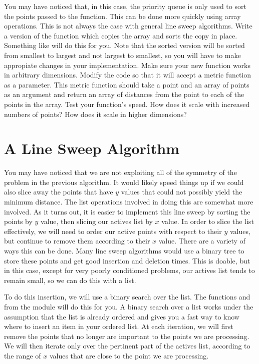 \begin{problem}
You may have noticed that, in this case, the priority queue is only used to sort the points passed to the function. 
This can be done more quickly using array operations. 
This is not always the case with general line sweep algorithms. 
Write a version of the function which copies the array and sorts the copy in place. 
Something like  will do this for you. 
Note that the sorted version will be sorted from smallest to largest and not largest to smallest, so you will have to make appropiate changes in your implementation.
Make sure your new function works in arbitrary dimensions. 
Modify the code so that it will accept a metric function as a parameter. 
This metric function should take a point and an array of points as an argument and return an array of distances from the point to each of the points in the array. 
Test your function's speed. 
How does it scale with increased numbers of points? 
How does it scale in higher dimensions?
\end{problem}

\section*{A Line Sweep Algorithm}

You may have noticed that we are not exploiting all of the symmetry of the problem in the previous algorithm. 
It would likely speed things up if we could also slice away the points that have $y$ values that could not possibly yield the minimum distance. 
The list operations involved in doing this are somewhat more involved. 
As it turns out, it is easier to implement this line sweep by sorting the points by $y$ value, then slicing our actives list by $x$ value.
In order to slice the list effectively, we will need to order our active points with respect to their $y$ values, but continue to remove them according to their $x$ value. 
There are a variety of ways this can be done. 
Many line sweep algorithms would use a binary tree to store these points and get good insertion and deletion times. 
This is doable, but in this case, except for very poorly conditioned problems, our actives list tends to remain small, so we can do this with a list. 

To do this insertion, we will use a binary search over the list. 
The functions  and  from the  module will do this for you. 
A binary search over a list works under the assumption that the list is already ordered and gives you a fast way to know where to insert an item in your ordered list. 
At each iteration, we will first remove the points that no longer are important to the points we are processing. 
We will then iterate only over the pertinent part of the actives list, according to the range of $x$ values that are close to the point we are processing.

